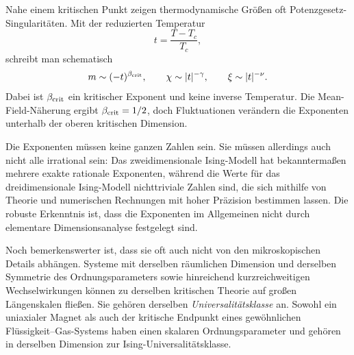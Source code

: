 Nahe einem kritischen Punkt zeigen thermodynamische Größen oft Potenzgesetz-Singularitäten. Mit der reduzierten Temperatur
\begin{equation}
t=\frac{T-T_c}{T_c},
\end{equation}
schreibt man schematisch
\begin{equation}
m\sim(-t)^{\beta_{\rm crit}},
\qquad
\chi\sim |t|^{-\gamma},
\qquad
\xi\sim |t|^{-\nu}.
\label{eq:critical-exponents}
\end{equation}
Dabei ist \(\beta_{\rm crit}\) ein kritischer Exponent und keine inverse Temperatur. Die Mean-Field-Näherung ergibt \(\beta_{\rm crit}=1/2\), doch Fluktuationen verändern die Exponenten unterhalb der oberen kritischen Dimension.

Die Exponenten müssen keine ganzen Zahlen sein. Sie müssen allerdings auch nicht alle irrational sein: Das zweidimensionale Ising-Modell hat bekanntermaßen mehrere exakte rationale Exponenten, während die Werte für das dreidimensionale Ising-Modell nichttriviale Zahlen sind, die sich mithilfe von Theorie und numerischen Rechnungen mit hoher Präzision bestimmen lassen. Die robuste Erkenntnis ist, dass die Exponenten im Allgemeinen nicht durch elementare Dimensionsanalyse festgelegt sind.

Noch bemerkenswerter ist, dass sie oft auch nicht von den mikroskopischen Details abhängen. Systeme mit derselben räumlichen Dimension und derselben Symmetrie des Ordnungsparameters sowie hinreichend kurzreichweitigen Wechselwirkungen können zu derselben kritischen Theorie auf großen Längenskalen fließen. Sie gehören derselben \emph{Universalitätsklasse} an. Sowohl ein uniaxialer Magnet als auch der kritische Endpunkt eines gewöhnlichen Flüssigkeit--Gas-Systems haben einen skalaren Ordnungsparameter und gehören in derselben Dimension zur Ising-Universalitätsklasse.

\begin{classroomqa}
\end{classroomqa}

